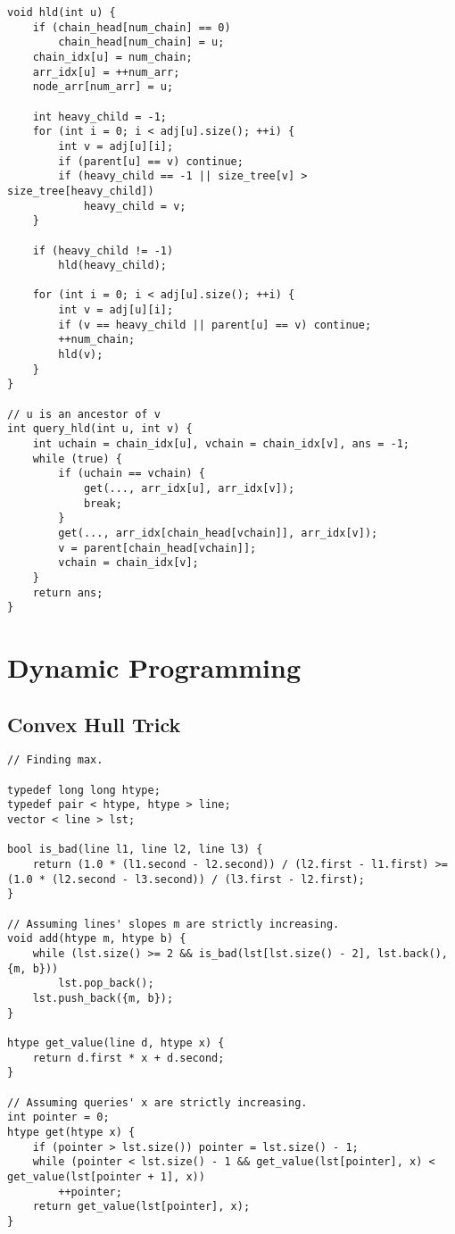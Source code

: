 \documentclass[10pt,landscape]{article}
\begin{document}
\begin{multicols}{2}
\begin{lstlisting}
void hld(int u) {
    if (chain_head[num_chain] == 0)
        chain_head[num_chain] = u;
    chain_idx[u] = num_chain;
    arr_idx[u] = ++num_arr;
    node_arr[num_arr] = u;
    
    int heavy_child = -1;
    for (int i = 0; i < adj[u].size(); ++i) {
        int v = adj[u][i];
        if (parent[u] == v) continue;
        if (heavy_child == -1 || size_tree[v] > size_tree[heavy_child])
            heavy_child = v;
    }

    if (heavy_child != -1)
        hld(heavy_child);

    for (int i = 0; i < adj[u].size(); ++i) {
        int v = adj[u][i];
        if (v == heavy_child || parent[u] == v) continue;
        ++num_chain;
        hld(v);
    }
}

// u is an ancestor of v
int query_hld(int u, int v) {
    int uchain = chain_idx[u], vchain = chain_idx[v], ans = -1;
    while (true) {
        if (uchain == vchain) {
            get(..., arr_idx[u], arr_idx[v]);
            break;
        }
        get(..., arr_idx[chain_head[vchain]], arr_idx[v]);
        v = parent[chain_head[vchain]];
        vchain = chain_idx[v];
    }
    return ans;
}
\end{lstlisting}
\section{Dynamic Programming}
\subsection{Convex Hull Trick}
\begin{lstlisting}
// Finding max.

typedef long long htype;
typedef pair < htype, htype > line;
vector < line > lst;

bool is_bad(line l1, line l2, line l3) {
    return (1.0 * (l1.second - l2.second)) / (l2.first - l1.first) >= (1.0 * (l2.second - l3.second)) / (l3.first - l2.first);
}

// Assuming lines' slopes m are strictly increasing.
void add(htype m, htype b) {
    while (lst.size() >= 2 && is_bad(lst[lst.size() - 2], lst.back(), {m, b}))
        lst.pop_back();
    lst.push_back({m, b});
}

htype get_value(line d, htype x) {
    return d.first * x + d.second;
}

// Assuming queries' x are strictly increasing.
int pointer = 0;
htype get(htype x) {
    if (pointer > lst.size()) pointer = lst.size() - 1;
    while (pointer < lst.size() - 1 && get_value(lst[pointer], x) < get_value(lst[pointer + 1], x))
        ++pointer;
    return get_value(lst[pointer], x);
}
\end{lstlisting}

\end{multicols}
\end{document}
